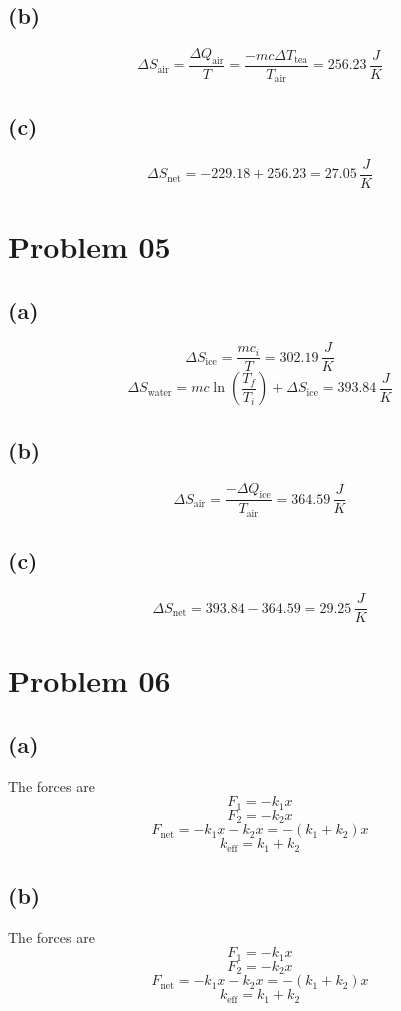 \documentclass[letter]{article}
\begin{document}
\subsection*{(b)} 
\[
\Delta S_\text{air} = \frac{\Delta Q_\text{air}}{T} = \frac{- m c \Delta T_\text{tea}}{T_\text{air}} = 
256.23 \, \frac{J}{K}
\]
\subsection*{(c)} 
\[
\Delta S_\text{net} = - 229.18 + 256.23 = 27.05 \, \frac{J}{K}
\] 

\section*{Problem 05} 
\subsection*{(a)} 
\[
\Delta S_\text{ice} = \frac{m c_i}{T} = 302.19 \, \frac{J}{K}
\] 
\[
\Delta S_\text{water} = mc \ln\left(\frac{T_f}{T_i}\right) + \Delta S_\text{ice} = 393.84 \, \frac{J}{K}
\] 

\subsection*{(b)} 
\[
\Delta S_\text{air} = \frac{- \Delta Q_\text{ice} }{T_\text{air}} = 364.59 \, \frac{J}{K}
\] 

\subsection*{(c)} 
\[
\Delta S_\text{net} = 393.84 - 364.59 = 29.25 \, \frac{J}{K}
\]

\section*{Problem 06} 
\subsection*{(a)} 
The forces are 
\[
F_1 = - k_1 x
\] 
\[
F_2 = - k_2 x
\] 
\[
F_\text{net} = - k_1 x - k_2 x = - (k_1 + k_2) x
\] 
\[
k_\text{eff} = k_1 + k_2
\] 

\subsection*{(b)} 
The forces are 
\[
F_1 = - k_1 x
\] 
\[
F_2 = - k_2 x 
\] 
\[
F_\text{net} = -k_1 x - k_2 x =  - \left(k_1 + k_2\right) x
\] 
\[
k_\text{eff} = k_1 + k_2
\] 
\end{document}
